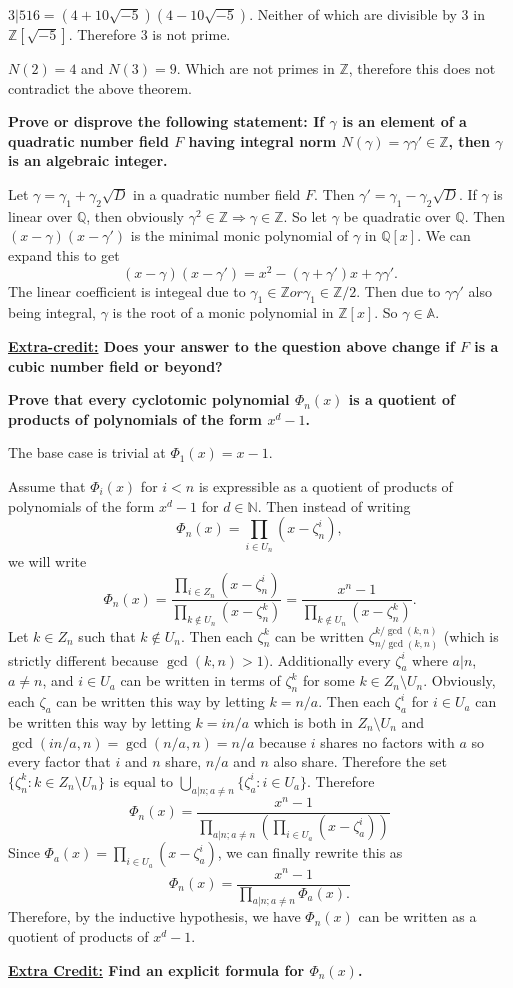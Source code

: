 \documentclass[letterpaper, 12pt]{article}
\begin{document}
    $3 | 516 = (4+10\sqrt{-5})(4-10\sqrt{-5})$. Neither of which are divisible by 3 in $\mathbb{Z}[\sqrt{-5}]$. Therefore 3 is not prime.

    $N(2)=4$ and $N(3)=9$. Which are not primes in $\mathbb{Z}$, therefore this does not contradict the above theorem.

\textbf{Prove or disprove the following statement:
If $\gamma$ is an element of a quadratic number field $F$ having integral norm $N(\gamma)=\gamma\gamma'\in\mathbb{Z}$, then $\gamma$ is an algebraic integer.}

    Let $\gamma=\gamma_1+\gamma_2\sqrt{D}$ in a quadratic number field $F$. Then $\gamma'=\gamma_1-\gamma_2\sqrt{D}$. If $\gamma$ is linear over $\mathbb{Q}$, then obviously $\gamma^2\in\mathbb{Z}\Rightarrow\gamma\in\mathbb{Z}$. So let $\gamma$ be quadratic over $\mathbb{Q}$. Then $(x-\gamma)(x-\gamma')$ is the minimal monic polynomial of $\gamma$ in $\mathbb{Q}[x]$. We can expand this to get
    $$(x-\gamma)(x-\gamma')= x^2 - (\gamma+\gamma')x +\gamma\gamma'.$$
    The linear coefficient is integeal due to $\gamma_1\in\mathbb{Z} or \gamma_1\in\mathbb{Z}/2$. Then due to $\gamma\gamma'$ also being integral, $\gamma$ is the root of a monic polynomial in $\mathbb{Z}[x]$. So $\gamma\in\mathbb{A}$.
    
    
\textbf{\underline{Extra-credit:} Does your answer to the question above change if $F$ is a cubic number field or beyond?}

    

\textbf{Prove that every cyclotomic polynomial $\Phi_n(x)$ is a quotient of products of polynomials of the form $x^d-1$.}

    The base case is trivial at $\Phi_1(x)=x-1$.
    
    Assume that $\Phi_i(x)$ for $i<n$ is expressible as a quotient of products of polynomials of the form $x^d-1$ for $d\in\mathbb{N}$. Then instead of writing 
    $$\Phi_n(x)=\prod_{i\in U_n}(x-\zeta_n^i),$$
    we will write
    $$\Phi_n(x)=\frac{\prod_{i\in Z_n}(x-\zeta_n^i)}{\prod_{k\not\in U_n}(x-\zeta_n^k)}=\frac{x^n-1}{\prod_{k\not\in U_n}(x-\zeta_n^k)}.$$
    Let $k\in Z_n$ such that $k\not\in U_n$. Then each $\zeta_n^k$ can be written $\zeta_{n/\gcd(k,n)}^{k/\gcd(k,n)}$ (which is strictly different because $\gcd(k,n)>1)$. Additionally every $\zeta_a^i$ where $a|n$, $a\not=n$, and $i\in U_a$ can be written in terms of $\zeta_n^k$ for some $k\in Z_n\setminus U_n$. Obviously, each $\zeta_a$ can be written this way by letting $k=n/a$. Then each $\zeta_a^i$ for $i\in U_a$ can be written this way by letting $k=in/a$ which is both in $Z_n\setminus U_n$ and $\gcd(in/a,n)=\gcd(n/a,n)=n/a$ because $i$ shares no factors with $a$ so every factor that $i$ and $n$ share, $n/a$ and $n$ also share. Therefore the set $\{\zeta_n^k:k\in Z_n\setminus U_n \}$ is equal to $\bigcup_{a|n;a\not=n}\{\zeta_a^i:i\in U_a\}$. Therefore
    $$\Phi_n(x)=\frac{x^n-1}{\prod_{a|n;a\not=n}(\prod_{i\in U_a}(x-\zeta_a^i))}$$
    Since $\Phi_a(x)=\prod_{i\in U_a}(x-\zeta_a^i)$, we can finally rewrite this as
    $$\Phi_n(x)=\frac{x^n-1}{\prod_{a|n;a\not=n}\Phi_a(x).}$$
    Therefore, by the inductive hypothesis, we have $\Phi_n(x)$ can be written as a quotient of products of $x^d-1$.

\textbf{\underline{Extra Credit:} Find an explicit formula for $\Phi_n(x)$.}
\end{document}
